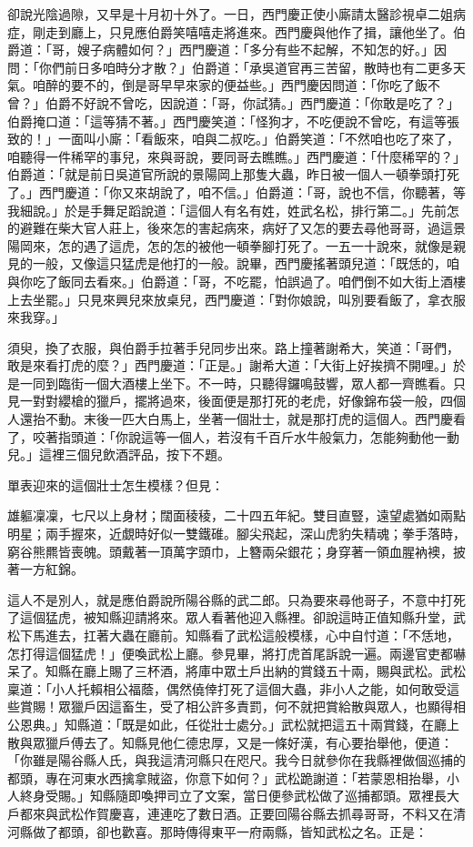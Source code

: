 卻說光陰過隙，又早是十月初十外了。一日，西門慶正使小廝請太醫診視卓二姐病症，剛走到廳上，只見應伯爵笑嘻嘻走將進來。西門慶與他作了揖，讓他坐了。伯爵道：「哥，嫂子病體如何？」西門慶道：「多分有些不起解，不知怎的好。」因問：「你們前日多咱時分才散？」伯爵道：「承吳道官再三苦留，散時也有二更多天氣。咱醉的要不的，倒是哥早早來家的便益些。」西門慶因問道：「你吃了飯不曾？」伯爵不好說不曾吃，因說道：「哥，你試猜。」西門慶道：「你敢是吃了？」伯爵掩口道：「這等猜不著。」西門慶笑道：「怪狗才，不吃便說不曾吃，有這等張致的！」一面叫小廝：「看飯來，咱與二叔吃。」伯爵笑道：「不然咱也吃了來了，咱聽得一件稀罕的事兒，來與哥說，要同哥去瞧瞧。」西門慶道：「什麼稀罕的？」伯爵道：「就是前日吳道官所說的景陽岡上那隻大蟲，昨日被一個人一頓拳頭打死了。」西門慶道：「你又來胡說了，咱不信。」伯爵道：「哥，說也不信，你聽著，等我細說。」於是手舞足蹈說道：「這個人有名有姓，姓武名松，排行第二。」先前怎的避難在柴大官人莊上，後來怎的害起病來，病好了又怎的要去尋他哥哥，過這景陽岡來，怎的遇了這虎，怎的怎的被他一頓拳腳打死了。一五一十說來，就像是親見的一般，又像這只猛虎是他打的一般。說畢，西門慶搖著頭兒道：「既恁的，咱與你吃了飯同去看來。」伯爵道：「哥，不吃罷，怕誤過了。咱們倒不如大街上酒樓上去坐罷。」只見來興兒來放桌兒，西門慶道：「對你娘說，叫別要看飯了，拿衣服來我穿。」

須臾，換了衣服，與伯爵手拉著手兒同步出來。路上撞著謝希大，笑道：「哥們，敢是來看打虎的麼？」西門慶道：「正是。」謝希大道：「大街上好挨擠不開哩。」於是一同到臨街一個大酒樓上坐下。不一時，只聽得鑼鳴鼓響，眾人都一齊瞧看。只見一對對纓槍的獵戶，擺將過來，後面便是那打死的老虎，好像錦布袋一般，四個人還抬不動。末後一匹大白馬上，坐著一個壯士，就是那打虎的這個人。西門慶看了，咬著指頭道：「你說這等一個人，若沒有千百斤水牛般氣力，怎能夠動他一動兒。」這裡三個兒飲酒評品，按下不題。

單表迎來的這個壯士怎生模樣？但見：

雄軀凜凜，七尺以上身材；闊面稜稜，二十四五年紀。雙目直豎，遠望處猶如兩點明星；兩手握來，近覷時好似一雙鐵碓。腳尖飛起，深山虎豹失精魂；拳手落時，窮谷熊羆皆喪魄。頭戴著一頂萬字頭巾，上簪兩朵銀花；身穿著一領血腥衲襖，披著一方紅錦。

這人不是別人，就是應伯爵說所陽谷縣的武二郎。只為要來尋他哥子，不意中打死了這個猛虎，被知縣迎請將來。眾人看著他迎入縣裡。卻說這時正值知縣升堂，武松下馬進去，扛著大蟲在廳前。知縣看了武松這般模樣，心中自忖道：「不恁地，怎打得這個猛虎！」便喚武松上廳。參見畢，將打虎首尾訴說一遍。兩邊官吏都嚇呆了。知縣在廳上賜了三杯酒，將庫中眾土戶出納的賞錢五十兩，賜與武松。武松稟道：「小人托賴相公福蔭，偶然僥倖打死了這個大蟲，非小人之能，如何敢受這些賞賜！眾獵戶因這畜生，受了相公許多責罰，何不就把賞給散與眾人，也顯得相公恩典。」知縣道：「既是如此，任從壯士處分。」武松就把這五十兩賞錢，在廳上散與眾獵戶傅去了。知縣見他仁德忠厚，又是一條好漢，有心要抬舉他，便道：「你雖是陽谷縣人氏，與我這清河縣只在咫尺。我今日就參你在我縣裡做個巡捕的都頭，專在河東水西擒拿賊盜，你意下如何？」武松跪謝道：「若蒙恩相抬舉，小人終身受賜。」知縣隨即喚押司立了文案，當日便參武松做了巡捕都頭。眾裡長大戶都來與武松作賀慶喜，連連吃了數日酒。正要回陽谷縣去抓尋哥哥，不料又在清河縣做了都頭，卻也歡喜。那時傳得東平一府兩縣，皆知武松之名。正是：


